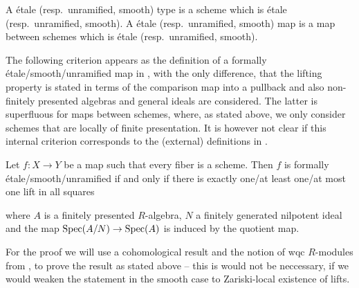 \begin{definition}
  A étale (resp.\ unramified, smooth) type is a scheme which is étale (resp.\ unramified, smooth).
  A étale (resp.\ unramified, smooth) map is a map between schemes which is étale (resp.\ unramified, smooth).
\end{definition}

The following criterion appears as the definition of a formally étale/smooth/unramified map in \cite[§17]{EGAIV4},
with the only difference, that the lifting property is stated in terms of the comparison map into a pullback and also non-finitely presented algebras and general ideals are considered. The latter is superfluous for maps between schemes, where, as stated above, we only consider schemes that are locally of finite presentation. It is however not clear if this internal criterion corresponds to the (external) definitions in \cite[§17]{EGAIV4}.

\begin{remark}
  \label{connection-to-ega-definition}
  Let $f:X\to Y$ be a map such that every fiber is a scheme.
  Then $f$ is formally étale/smooth/unramified if and only if there is exactly one/at least one/at most one lift in all squares
  \begin{center}
  \end{center}
where $A$ is a finitely presented $R$-algebra, $N$ a finitely generated nilpotent ideal and the map $\operatorname{Spec}(A/N)\to\operatorname{Spec}(A)$ is induced by the quotient map.
\end{remark}

For the proof we will use a cohomological result and the notion of wqc $R$-modules from \cite{draft},
to prove the result as stated above -- this is would not be neccessary, if we would weaken the statement in the smooth case to Zariski-local existence of lifts.

